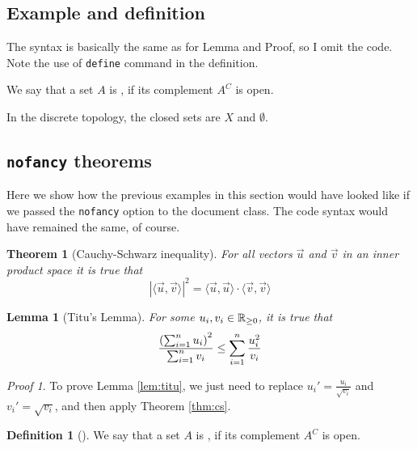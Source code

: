 \documentclass[letterpaper,11pt]{notes}
\theoremstyle{definition}
\newtheorem{dfn}{Definition}[section]
\theoremstyle{plain}
\newtheorem{Ithm}{Theorem}[section]
\newtheorem{Ilem}{Lemma}[section]
\newenvironment{definitionA}[2]
    {\begin{dfn}[#1]\ifstrempty{#2}{}{\label{dfnA:#2}}}
    {\end{dfn}}
\newenvironment{lemA}[2]
    {\begin{Ilem}[#1]\ifstrempty{#2}{}{\label{lemA:#2}}}
    {\end{Ilem}}
\newenvironment{thmA}[2]
    {\begin{Ithm}[#1]\ifstrempty{#2}{}{\label{thmA:#2}}}
    {\end{Ithm}}
\theoremstyle{remark}
\newtheorem*{proofA}{Proof}
\begin{document}
\subsection{Example and definition}
The syntax is basically the same as for Lemma and Proof, so I omit the code. Note the use of \texttt{define} command in the definition.

\begin{definition}{}{}
We say that a set $A$ is , if its complement $A^C$ is open.
\end{definition}

\begin{example}{}{}
In the discrete topology, the closed sets are $X$ and $\emptyset$.
\end{example}

\subsection{\texttt{nofancy} theorems} \label{nofancy}
Here we show how the previous examples in this section would have looked like if we passed the \texttt{nofancy} option to the document class. The code syntax would have remained the same, of course.

\begin{thmA}{Cauchy-Schwarz inequality}{cs}
For all vectors $\vec{u}$ and $\vec{v}$ in an inner product space it is true that
\begin{equation}
    \left|\langle\vec{u}, \vec{v}\rangle\right|^2 = \langle\vec{u}, \vec{u} \rangle \cdot \langle\vec{v}, \vec{v} \rangle 
\end{equation}
\end{thmA}

\begin{lemA}{Titu's Lemma}{titu}
For some $u_i, v_i \in \mathbb{R}_{\geq 0}$, it is true that
\begin{equation}
    \frac{\left(\sum_{i=1}^n u_i\right)^2}{\sum_{i=1}^n v_i} \leq \sum_{i=1}^n \frac{u_i^2}{v_i}
\end{equation}
\end{lemA}

\begin{proofA}
To prove Lemma \ref{lem:titu}, we just need to replace $u_i' = \frac{u_i}{\sqrt{v_i}}$ and $v_i' = \sqrt{v_i}$, and then apply Theorem \ref{thm:cs}. \hfill \qedsymbol %
\end{proofA}

\begin{definitionA}{}{}
We say that a set $A$ is , if its complement $A^C$ is open.
\end{definitionA}
\end{document}
